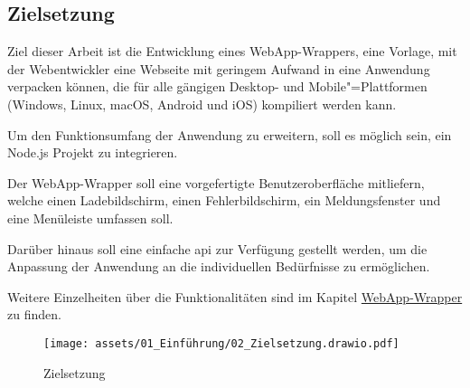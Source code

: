 \subsection{Zielsetzung}

Ziel dieser Arbeit ist die Entwicklung eines WebApp-Wrappers, eine Vorlage, mit der Webentwickler eine Webseite mit geringem Aufwand in eine Anwendung verpacken können, die für alle gängigen Desktop- und Mobile"=Plattformen (Windows, Linux, macOS, Android und iOS) kompiliert werden kann.

Um den Funktionsumfang der Anwendung zu erweitern, soll es möglich sein, ein Node.js Projekt zu integrieren.

Der WebApp-Wrapper soll eine vorgefertigte Benutzeroberfläche mitliefern, welche einen Ladebildschirm, einen Fehlerbildschirm, ein Meldungsfenster und eine Menüleiste umfassen soll.

Darüber hinaus soll eine einfache \ac{api} zur Verfügung gestellt werden, um die Anpassung der Anwendung an die individuellen Bedürfnisse zu ermöglichen.

Weitere Einzelheiten über die Funktionalitäten sind im Kapitel \hyperref[sec:WebApp-Wrapper]{WebApp-Wrapper} zu finden.

\begin{figure}[H]
  \centering
  \texttt{[image: assets/01\_Einführung/02\_Zielsetzung.drawio.pdf]}
  \caption[Zielsetzung]{Zielsetzung}
\end{figure}
